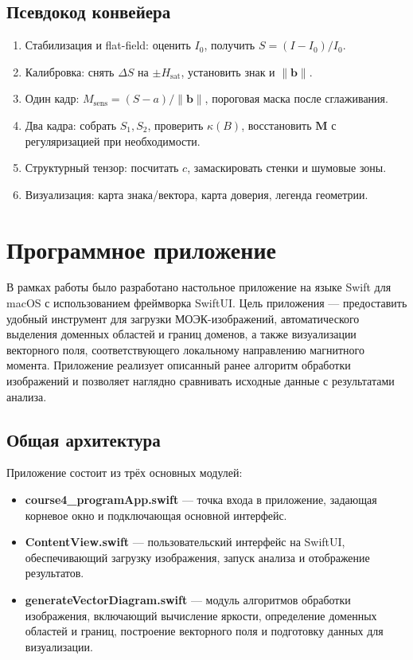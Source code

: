\documentclass[12pt,a4paper]{article}
\numberwithin{equation}{section}
\begin{document}
\subsection{Псевдокод конвейера}
\begin{enumerate}
  \item Стабилизация и flat-field: оценить \(I_0\), получить \(S=(I-I_0)/I_0\).
  \item Калибровка: снять \(\Delta S\) на \(\pm H_{\text{sat}}\), установить знак и \(\|\mathbf b\|\).
  \item Один кадр: \(M_{\text{sens}}=(S-a)/\|\mathbf b\|\), пороговая маска после сглаживания.
  \item Два кадра: собрать \(S_1,S_2\), проверить \(\kappa(B)\), восстановить \(\mathbf M\) с регуляризацией при необходимости.
  \item Структурный тензор: посчитать \(c\), замаскировать стенки и шумовые зоны.
  \item Визуализация: карта знака/вектора, карта доверия, легенда геометрии.
\end{enumerate}

\section{Программное приложение}

В рамках работы было разработано настольное приложение на языке Swift для macOS с использованием фреймворка SwiftUI. Цель приложения — предоставить удобный инструмент для загрузки МОЭК-изображений, автоматического выделения доменных областей и границ доменов, а также визуализации векторного поля, соответствующего локальному направлению магнитного момента. Приложение реализует описанный ранее алгоритм обработки изображений и позволяет наглядно сравнивать исходные данные с результатами анализа.

\subsection{Общая архитектура}

Приложение состоит из трёх основных модулей:

\begin{itemize}
    \item \textbf{course4\_programApp.swift} — точка входа в приложение, задающая корневое окно и подключающая основной интерфейс.
    \item \textbf{ContentView.swift} — пользовательский интерфейс на SwiftUI, обеспечивающий загрузку изображения, запуск анализа и отображение результатов.
    \item \textbf{generateVectorDiagram.swift} — модуль алгоритмов обработки изображения, включающий вычисление яркости, определение доменных областей и границ, построение векторного поля и подготовку данных для визуализации.
\end{itemize}
\end{document}
